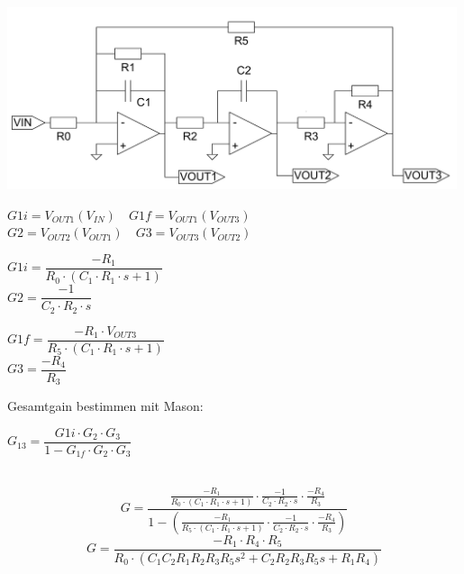 \begin{minipage}{0.49\textwidth}
\includegraphics[width = 0.99\textwidth]{images/filter.png}
\end{minipage}
\begin{minipage}{0.49\textwidth}
$
G1i = V_{OUT1}(V_{IN})\quad G1f = V_{OUT1}(V_{OUT3})
$\\
$
G2 = V_{OUT2}(V_{OUT1}) \quad G3 = V_{OUT3}(V_{OUT2})
$\\[1em]
\begin{minipage}[t]{0.49\textwidth}
$
G1i = \dfrac{-R_1}{R_0\cdot(C_1\cdot R_1\cdot s+1)}
$\\
$
G2 = \dfrac{-1}{C_2\cdot R_2\cdot s}
$	
\end{minipage}
\begin{minipage}[t]{0.49\textwidth}
$
G1f = \dfrac{-R_1\cdot V_{OUT3}}{R_5\cdot(C_1\cdot R_1\cdot s+1)}
$\\
$
G3 = \dfrac{-R_4}{R_3}
$
\end{minipage}

\begin{minipage}[t]{0.39\textwidth}
Gesamtgain bestimmen mit Mason:
\end{minipage}\hfill
\begin{minipage}[t]{0.49\textwidth}
$
G_{13} = \dfrac{G1i\cdot G_2\cdot G_3}{1-G_{1f}\cdot G_2\cdot G_3}
$
\end{minipage}\\
\[
G = \dfrac{\frac{-R_1}{R_0\cdot(C_1\cdot R_1\cdot s+1)}\cdot \frac{-1}{C_2\cdot R_2\cdot s}\cdot \frac{-R_4}{R_3}}{1-\left(\frac{-R_1}{R_5\cdot(C_1\cdot R_1\cdot s+1)}\cdot 	\frac{-1}{C_2\cdot R_2\cdot s}\cdot \frac{-R_4}{R_3}\right)}
\]
\[
G = \frac{-R_1\cdot R_4\cdot R_5}{R_0\cdot \left(C_1C_2R_1R_2R_3R_5 s^2 + C_2R_2R_3R_5 s + R_1R_4\right)}
\]
\end{minipage}


